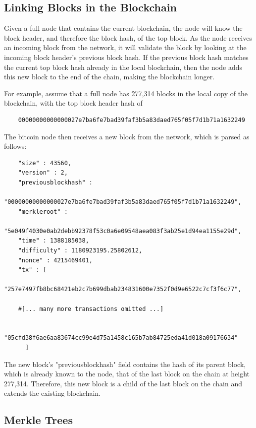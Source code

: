 \documentclass{article}
\newcounter{example}[section]
\begin{document}
  \subsection{Linking Blocks in the Blockchain}

    Given a full node that contains the current blockchain, the node will know the block header, and therefore the block hash, of the top block. As the node receives an incoming block from the network, it will validate the block by looking at the incoming block header's previous block hash. If the previous block hash matches the current top block hash already in the local blockchain, then the node adds this new block to the end of the chain, making the blockchain longer.

    For example, assume that a full node has 277,314 blocks in the local copy of the blockchain, with the top block header hash of

    \begin{lstlisting}
    00000000000000027e7ba6fe7bad39faf3b5a83daed765f05f7d1b71a1632249
    \end{lstlisting}

    The bitcoin node then receives a new block from the network, which is parsed as follows:

    \begin{lstlisting}
    "size" : 43560,
    "version" : 2,
    "previousblockhash" :
        "00000000000000027e7ba6fe7bad39faf3b5a83daed765f05f7d1b71a1632249",
    "merkleroot" :
        "5e049f4030e0ab2debb92378f53c0a6e09548aea083f3ab25e1d94ea1155e29d",
    "time" : 1388185038,
    "difficulty" : 1180923195.25802612,
    "nonce" : 4215469401,
    "tx" : [
        "257e7497fb8bc68421eb2c7b699dbab234831600e7352f0d9e6522c7cf3f6c77",

    #[... many more transactions omitted ...]

        "05cfd38f6ae6aa83674cc99e4d75a1458c165b7ab84725eda41d018a09176634"
      ]
    \end{lstlisting}

    The new block's "previousblockhash" field contains the hash of its parent block, which is already known to the node, that of the last block on the chain at height 277,314. Therefore, this new block is a child of the last block on the chain and extends the existing blockchain.

  \subsection{Merkle Trees}
\end{document}
